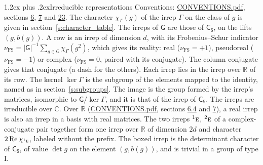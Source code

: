 \documentclass[10pt,a4paper]{article}
\makeatletter
\renewcommand\section{\@startsection{section}{1}{\z@}{-3ex plus -1ex minus -.2ex}%
  {1.2ex plus .2ex}{\normalfont\large\sffamily\bfseries\color{parttitle}}}
\numberwithin{equation}{section}
\newcommand{\grp}[1]{\mathsf{#1}}
\newcommand{\irr}[1]{\text{\normalfont\scshape #1}}
\newcommand{\conjpair}[1]{{}^{#1}}
\newcommand{\irchar}[1]{\chi_{#1}}
\newcommand{\fsind}{\nu_{\mathrm{FS}}}
\makeatother
\begin{document}
\section{Irreducible representations}\label{s:irreps}
Conventions: \href{../../CONVENTIONS.pdf}{CONVENTIONS.pdf}, sections \href{../../../rotation/CONVENTIONS.pdf\#conv.6}{6}, \href{../../../rotation/CONVENTIONS.pdf\#conv.7}{7} and \href{../../CONVENTIONS.pdf\#conv.23}{23}.
\leavevmode\label{n:function.character}\label{n:irrep.Gamma}The character $\irchar{\Gamma}(g)$ of the irrep $\Gamma$ on the class of $g$ is given in section~\ref{s:character_table}. The irreps of $\grp{G}$ are those of \href{../../../rotation/data/pdf/C5.pdf}{$\grp{C_{5}}$}, on the lifts $(g, b(g))$.
\leavevmode\label{n:index.dimension}\label{n:index.frobenius}\label{n:head.irrep}\label{n:head.reality}A row is an irrep of dimension $d$, with its Frobenius--Schur indicator $\fsind = |\grp{G}|^{-1}\allowbreak\sum_{g\in\grp{G}}\irchar{\Gamma}(g^2)$, which gives its reality: real ($\fsind = +1$), pseudoreal ($\fsind = -1$) or complex ($\fsind = 0$, paired with its conjugate). \label{n:head.conjugate}The column conjugate gives that conjugate (a dash for the others). \label{n:head.over.real}Each irrep lies in the irrep over $\mathbb{R}$ of its row. \label{n:head.kernel}The kernel $\ker\Gamma$ is the subgroup of the elements mapped to the identity, named as in section~\ref{s:subgroups}. \label{n:head.image}The image is the group formed by the irrep's matrices, isomorphic to $\grp{G}/\ker\Gamma$, and it is that of the irrep of \href{../../../rotation/data/pdf/C5.pdf}{$\grp{C_{5}}$}. The irreps are irreducible over $\mathbb{C}$. Over $\mathbb{R}$ (\href{../../CONVENTIONS.pdf}{CONVENTIONS.pdf}, sections \href{../../../rotation/CONVENTIONS.pdf\#conv.6.4}{6.4} and \href{../../../rotation/CONVENTIONS.pdf\#conv.7}{7}), a real irrep is also an irrep in a basis with real matrices. The two irreps $\conjpair{1}\irr{e}$, $\conjpair{2}\irr{e}$ of a complex-conjugate pair together form one irrep over $\mathbb{R}$ of dimension $2d$ and character $2\operatorname{Re}\irchar{\conjpair{1}\irr{e}}$, labeled without the prefix. \label{n:mark.determinant}The boxed irrep is the determinant character of \href{../../../rotation/data/pdf/C5.pdf}{$\grp{C_{5}}$}, of value $\det g$ on the element $(g, b(g))$, and is trivial in a group of type I.
\setlength{\emergencystretch}{2em}\par\setlength{\emergencystretch}{0pt}
\end{document}
